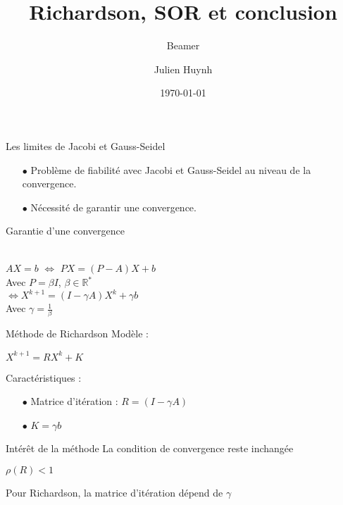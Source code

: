 \documentclass[10pt]{beamer}
\title{Richardson, SOR et conclusion}
\subtitle{Beamer}
\date{\today}
\author{Julien Huynh}
\institute{Cyb'Air}
\begin{document}
	{
	\usebackgroundtemplate{}
	\maketitle
}
	\begin{frame}{Les limites de Jacobi et Gauss-Seidel}
	\begin{itemize}
		\item[$\bullet$]Problème de \alert{fiabilité} avec Jacobi et Gauss-Seidel au niveau de la \alert{convergence}.\pause
		
		\item [$\bullet$]Nécessité de garantir une convergence.
	\end{itemize}
	
	\pause
	
	
	
\end{frame}
\begin{frame}{Garantie d'une convergence}
	\begin{center}
		\LARGE {}\\
		\pause
		$AX=b$ \pause $\Leftrightarrow$ $PX=(P-A)X+b$\\ %
		Avec $P = \beta I$, $\beta \in \mathbb{R}^*$\\
		$\Leftrightarrow X^{k+1}=(I-\gamma A)X^k+\gamma b$\\
		Avec $\gamma=\frac{1}{\beta}$
	\end{center}

\end{frame}
\begin{frame}{Méthode de \alert{Richardson}}
Modèle : 
	\begin{center}
		$X^{k+1}=RX^k+K $\\
	\end{center}
\pause
Caractéristiques :
\begin{itemize}
	\item [$\bullet$] Matrice d'itération : $R = (I-\gamma A)$ \pause
	\item[$\bullet$] $K = \gamma b$
\end{itemize}
\end{frame}
\begin{frame}{Intérêt de la méthode}
La condition de convergence reste inchangée  \pause
\begin{center}
	$\rho(R)<1$ 
\end{center}

\pause
	Pour Richardson, la matrice d'itération dépend de $\gamma$ \pause
	\begin{center}
	\end{center}
\end{frame}
\end{document}
